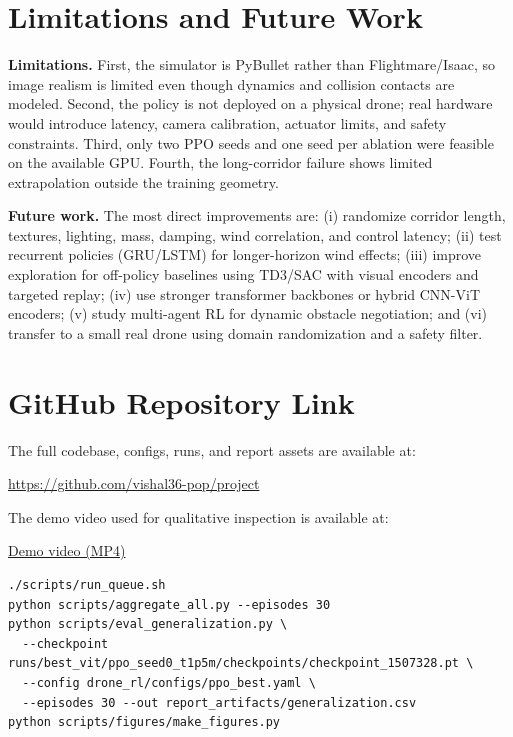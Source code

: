\documentclass[twocolumn,a4paper,10pt]{article}
\newcommand{\repo}{\href{https://github.com/vishal36-pop/project}{https://github.com/vishal36-pop/project}}
\newcommand{\demolink}{\href{https://iiitbac-my.sharepoint.com/:f:/g/personal/vishal_sriram_iiitb_ac_in/IgD556iWK6AsR59jMQwmS-3IARv652K0kij4iknw9YbVtEg?e=tKtRGe}{Demo video (MP4)}}
\begin{document}
\section{Limitations and Future Work}

\textbf{Limitations.}
First, the simulator is PyBullet rather than Flightmare/Isaac, so image
realism is limited even though dynamics and collision contacts are modeled.
Second, the policy is not deployed on a physical drone; real hardware would
introduce latency, camera calibration, actuator limits, and safety constraints.
Third, only two PPO seeds and one seed per ablation were feasible on the
available GPU.  Fourth, the long-corridor failure shows limited extrapolation
outside the training geometry.

\textbf{Future work.}
The most direct improvements are: (i) randomize corridor length, textures,
lighting, mass, damping, wind correlation, and control latency; (ii) test
recurrent policies (GRU/LSTM) for longer-horizon wind effects; (iii) improve
exploration for off-policy baselines using TD3/SAC with visual encoders and
targeted replay; (iv) use stronger transformer backbones or hybrid CNN-ViT
encoders; (v) study multi-agent RL for dynamic obstacle negotiation; and
(vi) transfer to a small real drone using domain randomization and a safety
filter.

\section{GitHub Repository Link}

The full codebase, configs, runs, and report assets are available at:
\begin{center}
\small \repo
\end{center}
The demo video used for qualitative inspection is available at:
\begin{center}
\small \demolink
\end{center}

\begin{tcolorbox}[enhanced, breakable,
  colback=boxBg, colframe=cGray!55, boxrule=0.4pt, arc=2pt,
  left=5pt, right=5pt, top=3pt, bottom=3pt,
  title=\footnotesize\textbf{Reproducibility commands},
  fonttitle=\footnotesize, coltitle=black,
  colbacktitle=cGray!18, attach boxed title to top left={xshift=4pt,yshift=-2pt},
  boxed title style={colframe=cGray!55, boxrule=0.3pt, arc=1pt}]
\begin{lstlisting}[basicstyle=\ttfamily\scriptsize,breaklines=true,
  columns=fullflexible,keepspaces=true]
./scripts/run_queue.sh
python scripts/aggregate_all.py --episodes 30
python scripts/eval_generalization.py \
  --checkpoint runs/best_vit/ppo_seed0_t1p5m/checkpoints/checkpoint_1507328.pt \
  --config drone_rl/configs/ppo_best.yaml \
  --episodes 30 --out report_artifacts/generalization.csv
python scripts/figures/make_figures.py
\end{lstlisting}
\end{tcolorbox}
\end{document}
